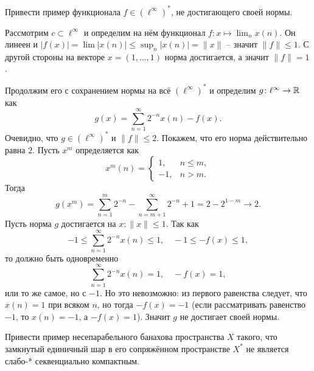 \begin{task}[T7]
    Привести пример функционала $f \in (\ell^\infty)^*$, не достигающего своей нормы.
\end{task}
\begin{solution}
    Рассмотрим $c \subset \ell^{\infty}$ и определим на нём функционал $f\colon x \mapsto \lim_{n} x(n)$.
    Он линеен и $|f(x)| = \lim |x(n)| \leq \sup_{n} |x(n)| = \|x\|$ -- значит $\|f\| \leq 1$.
    С другой стороны на векторе $x = (1, \ldots, 1)$ норма достигается, а значит $\|f\| = 1$.

    Продолжим его с сохранением нормы на всё $(\ell^\infty)^*$ и определим $g\colon \ell^\infty \to \mathbb{R}$ как
    \[
        g(x) = \sum_{n = 1}^{\infty} 2^{-n} x(n) - f(x).
    \]
    Очевидно, что $g \in (\ell^{\infty})^*$ и $\|f\| \leq 2$.
    Покажем, что его норма действительно равна $2$.
    Пусть $x^m$ определяется как
    \[
        x^m(n) = \begin{cases}
                     1, & n \leq m, \\
                     -1, & n > m.
        \end{cases}
    \]
    Тогда
    \[
        g(x^m) = \sum_{n = 1}^{m} 2^{-n} - \sum_{n = m + 1}^{\infty} 2^{-n} + 1 = 2 - 2^{1 - m} \rightarrow 2.
    \]
    Пусть норма $g$ достигается на $x\colon \|x\| \leq 1$.
    Так как
    \[
        -1 \leq \sum_{n = 1}^{\infty} 2^{-n}x(n) \leq 1, \quad -1 \leq -f(x) \leq 1,
    \]
    то должно быть одновременно
    \[
        \sum_{n = 1}^{\infty} 2^{-n}x(n) = 1, \quad -f(x) = 1,
    \]
    или то же самое, но с $-1$.
    Но это невозможно: из первого равенства следует, что $x(n) = 1$ при всяком $n$, но тогда $-f(x) = -1$ (если рассматривать равенство $-1$, то $x(n) = -1$, а $-f(x) = 1$).
    Значит $g$ не достигает своей нормы.
\end{solution}
\begin{task}[T8]
    Привести пример несепарабельного банахова пространства $X$ такого, что замкнутый единичный шар в его сопряжённом пространстве $X^*$ не является слабо-* секвенциально компактным.
\end{task}
